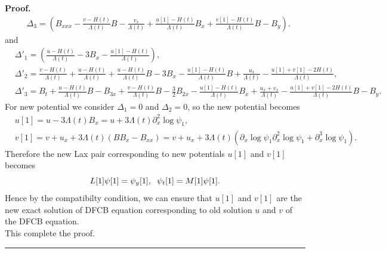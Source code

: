 \documentclass{article}%
\newenvironment{proof}[1][Proof]{\noindent\textbf{#1.} }{\ \rule{0.5em}{0.5em}}
\begin{document}
\begin{proof}
\begin{equation}
\begin{split}
&\Delta_3=(B_{xxx}-\frac{v-H(t)}{\Lambda(t)}B-\frac{v_x}{\Lambda(t)}+\frac{u[1]-H(t)}{\Lambda(t)}B_x+\frac{v[1]-H(t)}{\Lambda(t)}B-B_y).
\end{split}
\end{equation}
and 
\begin{equation}
\begin{split}
&\Delta'_1=(\frac{u-H(t)}{\Lambda(t)}-3B_x-\frac{u[1]-H(t)}{\Lambda(t)}),\\
&\Delta'_2=\frac{v-H(t)}{\Lambda(t)}+\frac{u-H(t)}{\Lambda(t)}+\frac{u-H(t)}{\Lambda(t)}B-3B_x-\frac{u[1]-H(t)}{\Lambda(t)}B+\frac{u_x}{\Lambda(t)}-\frac{u[1]+v[1]-2H(t)}{\Lambda(t)},\\
&\Delta'_3=B_t+\frac{u-H(t)}{\Lambda(t)}B-B_{3x}+\frac{v-H(t)}{\Lambda(t)}B-\frac{3}{2}B_{2x}-\frac{u[1]-H(t)}{\Lambda(t)}B_x+\frac{u_x+v_x}{\Lambda(t)}-\frac{u[1]+v[1]-2H(t)}{\Lambda(t)}B-B_y.
\end{split}
\end{equation}
For new potential we consider $\Delta_1=0$ and $\Delta_2=0$, so the new potential becomes 
\begin{equation}
\begin{split}
&u[1]=u-3\Lambda(t)B_x=u+3\Lambda(t)\partial^{2}_x\log\psi_1,\\
&v[1]=v+u_x+3\Lambda(t)(BB_x-B_{xx})=v+u_x+3\Lambda(t)(\partial_x\log\psi_1\partial^{2}_x\log\psi_1+\partial^{3}_x\log\psi_1).
\end{split}
\end{equation}
Therefore the new Lax pair corresponding to new potentials $u[1]$ and
$v[1]$ becomes
\begin{equation}
 L[1]\psi[1]=\psi_y[1],\hspace{2mm}\psi_t[1]=M[1]\psi[1]. \label{nlaxpair}
\end{equation}
 Hence by the compatibilty condition, we can ensure that $u[1]$ and
$v[1]$ are the new exact solution of DFCB equation corresponding to old solution $u$ and $v$ of the DFCB equation.\\
This complete the proof.
\end{proof}
\end{document}
